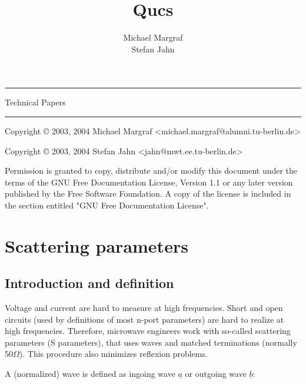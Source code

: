 \documentclass[10pt]{report}
\author{Michael Margraf \\ Stefan Jahn}
\title{Qucs}
\date{}
\makeatletter
\renewcommand{\maketitle}{\begin{titlepage}%
    \setlength{\parindent}{0pt}
    \vspace*{3cm}
    \begin{flushleft}
      \textbf{\begin{huge}\@title\end{huge}}
    \end{flushleft}
    \hrule height 3pt
    \begin{flushright}
      \begin{LARGE}Technical Papers\end{LARGE}
    \end{flushright}
    \vfill
    \begin{flushright}
      \begin{Large}\@author\end{Large}
    \end{flushright}
    \hrule height 3pt
    \vspace*{24pt}

Copyright \copyright{} 2003, 2004 Michael Margraf 
\textless michael.margraf@alumni.tu-berlin.de\textgreater

Copyright \copyright{} 2003, 2004 Stefan Jahn 
\textless jahn@mwt.ee.tu-berlin.de\textgreater

    \vspace*{12pt}

Permission is granted to copy, distribute and/or modify this document
under the terms of the GNU Free Documentation License, Version 1.1 or
any later version published by the Free Software Foundation.  A copy
of the license is included in the section entitled "GNU Free
Documentation License".

    \vspace*{1cm}

    \end{titlepage}%
    \setcounter{footnote}{0}%
}
\makeatother
\begin{document}
\maketitle

\tableofcontents

\setlength{\parindent}{0pt}
\newpage

\chapter{Scattering parameters}

\section{Introduction and definition}

Voltage and current are hard to measure at high frequencies.  Short
and open circuits (used by definitions of most n-port parameters) are
hard to realize at high frequencies.  Therefore, microwave engineers
work with so-called scattering parameters (S parameters), that uses
waves and matched terminations (normally $50 \Omega$).  This procedure
also minimizes reflexion problems.

\addvspace{12pt}

A (normalized) wave is defined as ingoing wave $\underline{a}$ or
outgoing wave $\underline{b}$:
\end{document}
